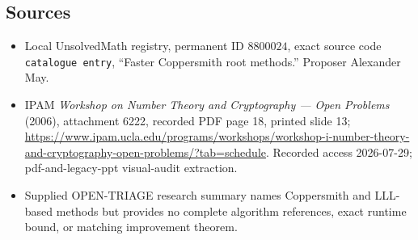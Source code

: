 \documentclass[11pt]{article}
\begin{document}
\subsection{Sources}
\begin{itemize}
\item Local UnsolvedMath registry, permanent ID \(8800024\), exact source code \texttt{catalogue entry}, ``Faster Coppersmith root methods.'' Proposer Alexander May.
\item IPAM \emph{Workshop on Number Theory and Cryptography --- Open Problems} (2006), attachment 6222, recorded PDF page 18, printed slide 13; \url{https://www.ipam.ucla.edu/programs/workshops/workshop-i-number-theory-and-cryptography-open-problems/?tab=schedule}. Recorded access 2026-07-29; pdf-and-legacy-ppt visual-audit extraction.
\item Supplied OPEN-TRIAGE research summary names Coppersmith and LLL-based methods but provides no complete algorithm references, exact runtime bound, or matching improvement theorem.
\end{itemize}
\end{document}
